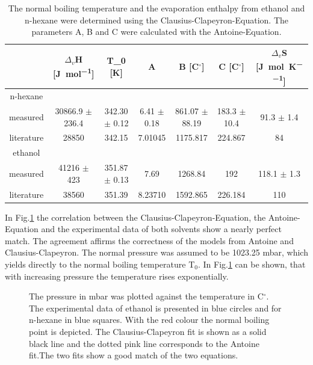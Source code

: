 \documentclass[a4paper,abstracton]{article}	                       %
\renewcommand{\cite}{\supercite}						%
\begin{document}
\begin{table}[H]
\centering
\begin{tabular}{c|c|c|c|c|c|c}
    & $\Delta_{\textit{v}}$H [\si{\joule\per\mol}] & T_{0} [K] & A & B [C$^{\circ}$] & C [C$^{\circ}$] & $\Delta_{\textit{v}}$S [\si{\joule\per\mol\per\kelvin}]\\
    \hline
    n-hexane \\
    \hline
    measured & 30866.9 $\pm$ 236.4 & 342.30 $\pm$ 0.12 & 6.41 $\pm$ 0.18 & 861.07 $\pm$ 88.19 & 183.3 $\pm$ 10.4 & 91.3 $\pm$ 1.4\\
    literature & 28850\cite{meister} & 342.15\cite{nhexane}& 7.01045\cite{meister} & 1175.817\cite{meister} & 224.867\cite{meister} & 84\cite{meister}\\
    \hline
    ethanol \\
    \hline
    measured & 41216 $\pm$ 423 & 351.87 $\pm$ 0.13 & 7.69 & 1268.84 & 192 & 118.1 $\pm$ 1.3\\
    literature & 38560\cite{meister} & 351.39\cite{meister} & 8.23710\cite{meister} & 1592.865\cite{meister} & 226.184\cite{meister}& 110\cite{meister}\\
    
\end{tabular}
\caption{\label{tab:Teil2}The normal boiling temperature and the evaporation enthalpy from ethanol and n-hexane were determined using the Clausius-Clapeyron-Equation. The parameters A, B and C were calculated with the Antoine-Equation.}
\end{table}

In Fig.\ref{fig:DDR2} the correlation between the Clausius-Clapeyron-Equation, the Antoine-Equation and the experimental data of both solvents show a nearly perfect match. The agreement affirms the correctness of the models from Antoine and Clausius-Clapeyron. The normal pressure was assumed to be 1023.25 mbar, which yields directly to the normal boiling temperature T$_{0}$. In Fig.\ref{fig:DDR2} can be shown, that with increasing pressure the temperature rises exponentially. 

\begin{figure}[H]
    \centering
    
    \caption{\label{fig:DDR2} The pressure in mbar was plotted against the temperature in C$^{\circ}$. The experimental data of ethanol is presented in blue circles and for n-hexane in blue squares. With the red colour the normal boiling point is depicted. The Clausius-Clapeyron fit is shown as a solid black line and the dotted pink line corresponds to the Antoine fit.The two fits show a good match of the two equations.} 
\end{figure}
\end{document}
